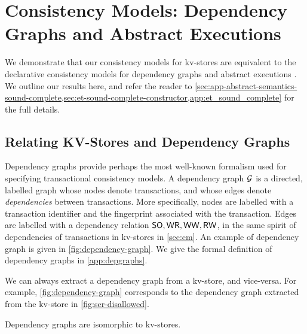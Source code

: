 \section{Consistency Models: Dependency Graphs and Abstract Executions}
\label{sec:other_formalisms}


We demonstrate that our consistency models for kv-stores
are equivalent to the declarative consistency models for 
dependency graphs \cite{adya} 
and abstract executions \cite{ev_transactions,framework-concur}. 
We outline our results here, and refer the reader
to \cref{sec:app-abstract-semantics-sound-complete,sec:et-sound-complete-constructor,app:et_sound_complete} for the full details.


\subsection{Relating KV-Stores and Dependency Graphs}
\label{sec:dep_graphs}
Dependency graphs \cite{adya-icde,adya} provide  perhaps the most
well-known 
formalism used for specifying transactional consistency models. 
A dependency graph $\mathcal{G}$ is a directed, labelled graph whose 
nodes denote transactions, and whose edges denote \emph{dependencies} between transactions.  
More specifically, nodes are labelled with a transaction identifier
and the fingerprint associated with the  transaction. 
Edges are labelled with a dependency relation $\mathsf{SO}, \mathsf{WR}, \mathsf{WW}, \mathsf{RW}$, in the 
same spirit of dependencies of transactions in kv-stores in \cref{sec:cm}.
An example of dependency graph is given in \cref{fig:dependency-graph}.
%
We give the formal definition of dependency graphs in \cref{app:depgraphs}.

We can always {extract} a dependency graph  from a kv-store, and vice-versa. 
For example, \cref{fig:dependency-graph} corresponds to the dependency graph extracted from the kv-store in \cref{fig:ser-disallowed}. 
\begin{theorem}
\label{thm:kv_graph_isomorph}
Dependency graphs are isomorphic to kv-stores.
\end{theorem}

